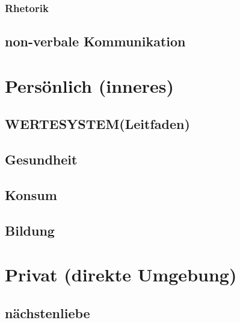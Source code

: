         \section{Rhetorik}
    \chapter{non-verbale Kommunikation}

\part{Persönlich (inneres)} 
    \chapter{WERTESYSTEM(Leitfaden)}
    \chapter{Gesundheit}
    \chapter{Konsum}
    \chapter{Bildung}

\part{Privat (direkte Umgebung)}
    \chapter{nächstenliebe}
